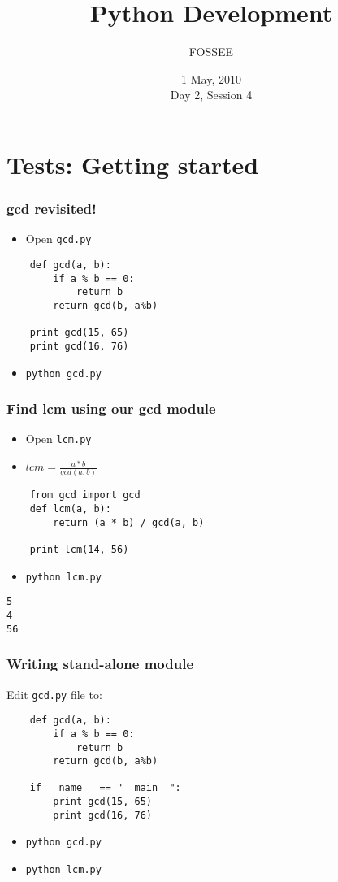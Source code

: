 \documentclass[compress,14pt]{beamer}
\title[Python Development]{Python Development}
\author[FOSSEE] {FOSSEE}
\institute[IIT Bombay] {Department of Aerospace Engineering\\IIT Bombay}
\date[] {1 May, 2010\\Day 2, Session 4}
\begin{document}
\begin{frame}
  \maketitle
\end{frame}

\section{Tests: Getting started}
\begin{frame}[fragile] 
  \frametitle{gcd revisited!}
  \begin{itemize}
  \item Open \texttt{gcd.py}
  \end{itemize}  
\begin{lstlisting}
    def gcd(a, b):
        if a % b == 0: 
            return b
        return gcd(b, a%b)

    print gcd(15, 65)
    print gcd(16, 76)
\end{lstlisting}
  \begin{itemize}
  \item \texttt{python gcd.py}
  \end{itemize}
\end{frame}

\begin{frame}[fragile] 
  \frametitle{Find lcm using our gcd module}
  \begin{itemize}
  \item Open \texttt{lcm.py}  
  \item $lcm = \frac{a * b}{gcd(a,b)}$
  \end{itemize}  
\begin{lstlisting}
    from gcd import gcd    
    def lcm(a, b):
        return (a * b) / gcd(a, b)
    
    print lcm(14, 56)
\end{lstlisting}
  \begin{itemize}
  \item \texttt{python lcm.py}
  \end{itemize}
  \begin{lstlisting}
5
4
56
  \end{lstlisting}    
\end{frame}

\begin{frame}[fragile] 
  \frametitle{Writing stand-alone module}  
Edit \texttt{gcd.py} file to:
\begin{lstlisting}
    def gcd(a, b):
        if a % b == 0: 
            return b
        return gcd(b, a%b)

    if __name__ == "__main__":        
        print gcd(15, 65)
        print gcd(16, 76)
\end{lstlisting}
  \begin{itemize}
  \item \texttt{python gcd.py}
  \item \texttt{python lcm.py}
  \end{itemize}
\end{frame}
\end{document}
